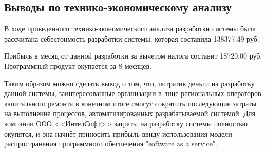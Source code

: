 \subsection{Выводы по технико-экономическому анализу }

В ходе проведенного технико-экономического анализа разработки системы была рассчитана себестоимость разработки системы, которая составила 138377,49 руб.

Прибыль в месяц от данной разработки за вычетом налога составит 18720,00 руб.
Программный продукт окупается за 8 месяцев.

Таким образом можно сделать вывод о том, что, потратив деньги на разработку данной системы, заинтересованные организации в лице региональных операторов капитального ремонта в конечном итоге смогут сократить последующие затраты на выполнение процессов, автоматизированных разрабатываемой системой.
Для компании ООО <<ИнтелСофт>> затраты на разработку системы полностью окупятся, и она начнёт приносить прибыль ввиду использования модели распространения программного обеспечения "software as a service".


\clearpage
\newpage
